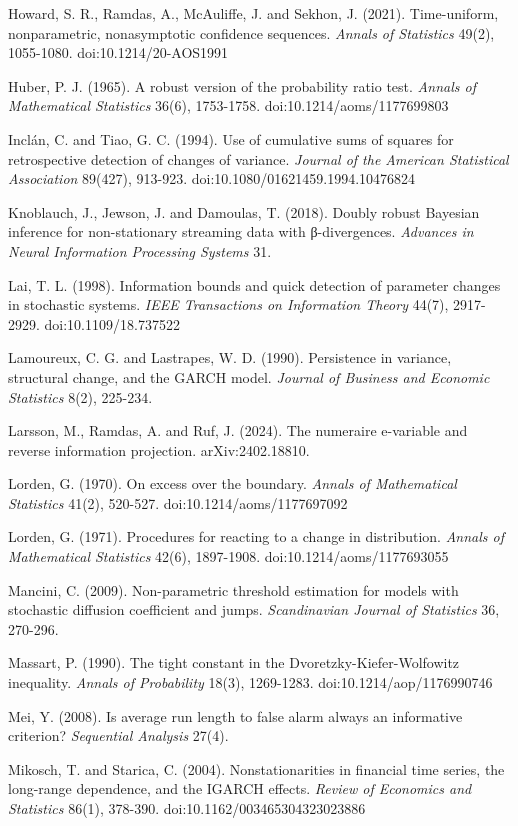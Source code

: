 \documentclass[
]{article}
\begin{document}
Howard, S. R., Ramdas, A., McAuliffe, J. and Sekhon, J. (2021).
Time-uniform, nonparametric, nonasymptotic confidence sequences.
\emph{Annals of Statistics} 49(2), 1055-1080. doi:10.1214/20-AOS1991

Huber, P. J. (1965). A robust version of the probability ratio test.
\emph{Annals of Mathematical Statistics} 36(6), 1753-1758.
doi:10.1214/aoms/1177699803

Inclán, C. and Tiao, G. C. (1994). Use of cumulative sums of squares for
retrospective detection of changes of variance. \emph{Journal of the
American Statistical Association} 89(427), 913-923.
doi:10.1080/01621459.1994.10476824

Knoblauch, J., Jewson, J. and Damoulas, T. (2018). Doubly robust
Bayesian inference for non-stationary streaming data with β-divergences.
\emph{Advances in Neural Information Processing Systems} 31.

Lai, T. L. (1998). Information bounds and quick detection of parameter
changes in stochastic systems. \emph{IEEE Transactions on Information
Theory} 44(7), 2917-2929. doi:10.1109/18.737522

Lamoureux, C. G. and Lastrapes, W. D. (1990). Persistence in variance,
structural change, and the GARCH model. \emph{Journal of Business and
Economic Statistics} 8(2), 225-234.

Larsson, M., Ramdas, A. and Ruf, J. (2024). The numeraire e-variable and
reverse information projection. arXiv:2402.18810.

Lorden, G. (1970). On excess over the boundary. \emph{Annals of
Mathematical Statistics} 41(2), 520-527. doi:10.1214/aoms/1177697092

Lorden, G. (1971). Procedures for reacting to a change in distribution.
\emph{Annals of Mathematical Statistics} 42(6), 1897-1908.
doi:10.1214/aoms/1177693055

Mancini, C. (2009). Non-parametric threshold estimation for models with
stochastic diffusion coefficient and jumps. \emph{Scandinavian Journal
of Statistics} 36, 270-296.

Massart, P. (1990). The tight constant in the Dvoretzky-Kiefer-Wolfowitz
inequality. \emph{Annals of Probability} 18(3), 1269-1283.
doi:10.1214/aop/1176990746

Mei, Y. (2008). Is average run length to false alarm always an
informative criterion? \emph{Sequential Analysis} 27(4).

Mikosch, T. and Starica, C. (2004). Nonstationarities in financial time
series, the long-range dependence, and the IGARCH effects. \emph{Review
of Economics and Statistics} 86(1), 378-390.
doi:10.1162/003465304323023886
\end{document}
